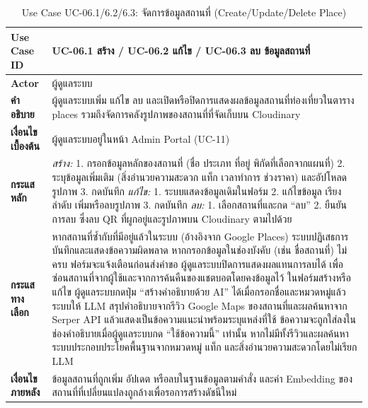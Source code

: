 \begin{table}[H]
\centering
\caption{Use Case UC-06.1/6.2/6.3: จัดการข้อมูลสถานที่ (Create/Update/Delete Place)}
\label{tab:uc06x}
\begin{tabular}{|p{3.2cm}|p{10cm}|}
\hline
\textbf{Use Case ID} & UC-06.1 สร้าง / UC-06.2 แก้ไข / UC-06.3 ลบ ข้อมูลสถานที่ \\ \hline
\textbf{Actor} & ผู้ดูแลระบบ \\ \hline
\textbf{คำอธิบาย} & ผู้ดูแลระบบเพิ่ม แก้ไข ลบ และเปิดหรือปิดการแสดงผลข้อมูลสถานที่ท่องเที่ยวในตาราง places รวมถึงจัดการคลังรูปภาพของสถานที่ที่จัดเก็บบน Cloudinary \\ \hline
\textbf{เงื่อนไขเบื้องต้น} & ผู้ดูแลระบบอยู่ในหน้า Admin Portal (UC-11) \\ \hline
\textbf{กระแสหลัก} & \textit{สร้าง:} 1. กรอกข้อมูลหลักของสถานที่ (ชื่อ ประเภท ที่อยู่ พิกัดที่เลือกจากแผนที่) 2. ระบุข้อมูลเพิ่มเติม (สิ่งอำนวยความสะดวก แท็ก เวลาทำการ ช่วงราคา) และอัปโหลดรูปภาพ 3. กดบันทึก \newline \textit{แก้ไข:} 1. ระบบแสดงข้อมูลเดิมในฟอร์ม 2. แก้ไขข้อมูล เรียงลำดับ เพิ่มหรือลบรูปภาพ 3. กดบันทึก \newline \textit{ลบ:} 1. เลือกสถานที่และกด ``ลบ'' 2. ยืนยันการลบ ซึ่งลบ QR ที่ผูกอยู่และรูปภาพบน Cloudinary ตามไปด้วย \\ \hline
\textbf{กระแสทางเลือก} & หากสถานที่ซ้ำกับที่มีอยู่แล้วในระบบ (อ้างอิงจาก Google Places) ระบบปฏิเสธการบันทึกและแสดงข้อความผิดพลาด \newline หากกรอกข้อมูลในช่องบังคับ (เช่น ชื่อสถานที่) ไม่ครบ ฟอร์มจะแจ้งเตือนก่อนส่งคำขอ \newline ผู้ดูแลระบบปิดการแสดงผลแทนการลบได้ เพื่อซ่อนสถานที่จากผู้ใช้และจากการค้นคืนของแชตบอตโดยคงข้อมูลไว้ \newline ในฟอร์มสร้างหรือแก้ไข ผู้ดูแลระบบกดปุ่ม ``สร้างคำอธิบายด้วย AI'' ได้เมื่อกรอกชื่อและหมวดหมู่แล้ว ระบบให้ LLM สรุปคำอธิบายจากรีวิว Google Maps ของสถานที่และผลค้นหาจาก Serper API แล้วแสดงเป็นข้อความแนะนำพร้อมระบุแหล่งที่ใช้ ข้อความจะถูกใส่ลงในช่องคำอธิบายเมื่อผู้ดูแลระบบกด ``ใช้ข้อความนี้'' เท่านั้น หากไม่มีทั้งรีวิวและผลค้นหา ระบบประกอบประโยคพื้นฐานจากหมวดหมู่ แท็ก และสิ่งอำนวยความสะดวกโดยไม่เรียก LLM \\ \hline
\textbf{เงื่อนไขภายหลัง} & ข้อมูลสถานที่ถูกเพิ่ม อัปเดต หรือลบในฐานข้อมูลตามคำสั่ง และค่า Embedding ของสถานที่ที่เปลี่ยนแปลงถูกล้างเพื่อรอการสร้างดัชนีใหม่ \\
\hline
\end{tabular}
\end{table}

